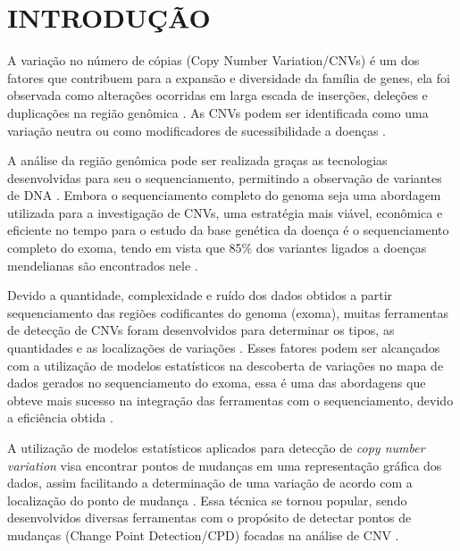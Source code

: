 
\chapter{INTRODUÇÃO}
\label{chap:introducao}

A variação no número de cópias (Copy Number Variation/CNVs) é um dos fatores que contribuem para a expansão e diversidade da família de genes, ela foi observada como alterações ocorridas em larga escada de inserções, deleções e duplicações na região genômica \cite{Perry2009,Zhao2013,Redon2006,Costain2016}. 
As CNVs podem ser identificada como uma variação neutra ou como modificadores de sucessibilidade a doenças \cite{Costain2016,Perry2009}.

A análise da região genômica pode ser realizada graças as tecnologias desenvolvidas para seu o sequenciamento, permitindo a observação de variantes de DNA \cite{Sathirapongsasuti2011}. Embora o sequenciamento completo do genoma seja uma abordagem utilizada para a investigação de CNVs, uma estratégia mais viável, econômica e eficiente no tempo para o estudo da base genética da doença é o sequenciamento completo do exoma, tendo em vista que 85\% dos variantes ligados a doenças mendelianas são encontrados nele \cite{Chong2015,Sathirapongsasuti2011,Fromer2012}.

Devido a quantidade, complexidade e ruído dos dados obtidos a partir sequenciamento das regiões codificantes do genoma (exoma), muitas ferramentas de detecção de CNVs foram desenvolvidos para determinar os tipos, as quantidades e as localizações de variações \cite{Fromer2012,Tan2014}. Esses fatores podem ser alcançados com a utilização de modelos estatísticos na descoberta de variações no mapa de dados gerados no sequenciamento do exoma, essa é uma das abordagens que obteve mais sucesso na integração das ferramentas com o sequenciamento, devido a eficiência obtida \cite{Tan2014}. 

A utilização de modelos estatísticos aplicados para detecção de \textit{copy number variation} visa encontrar pontos de mudanças em uma representação gráfica dos dados, assim facilitando a determinação de uma variação de acordo com a localização do ponto de mudança \cite{Zhao2013}. Essa técnica se tornou popular, sendo desenvolvidos diversas ferramentas com o propósito de detectar pontos de mudanças (Change Point Detection/CPD) focadas na análise de CNV \cite{Olshen2004,Baldi2001,Girimurugan2018,Picard2011,Plagnol2012,Muggeo2010}. 

